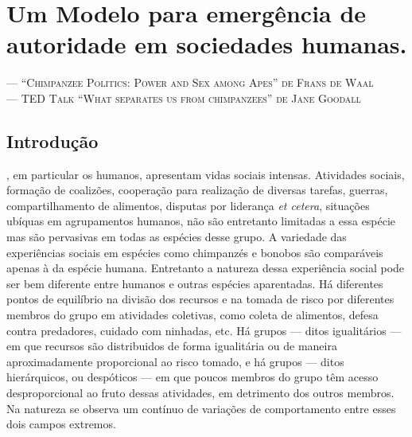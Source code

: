 \chapter{Um Modelo para emergência de autoridade em sociedades humanas.}
\begin{epigraphs}
 {\---- \textsc{``Chimpanzee Politics: Power and Sex among Apes'' de Frans de Waal\citep{deWaal2007}}}
 \\[2ex]
 {\---- \textsc{TED Talk ``What separates us from chimpanzees'' de Jane Goodall\citep{Goodall2002}}}
\end{epigraphs}

\label{ch:autoridade}
\section{Introdução}

, em particular os humanos, apresentam vidas sociais intensas. Atividades sociais, formação de coalizões, cooperação para realização de diversas tarefas, guerras, compartilhamento de alimentos, disputas por liderança \textit{et cetera}, situações ubíquas em agrupamentos humanos, não são entretanto limitadas a essa espécie mas são pervasivas em todas as espécies desse grupo. A variedade das experiências sociais em espécies como chimpanzés e bonobos são comparáveis apenas à da espécie humana\cite[-3.2cm]{deWaal2007, deWaal1990}. Entretanto a natureza dessa experiência social pode ser bem diferente entre humanos e outras espécies aparentadas. Há diferentes pontos de equilíbrio na divisão dos recursos e na tomada de risco por diferentes membros do grupo em atividades coletivas, como coleta de alimentos, defesa contra predadores, cuidado com ninhadas, etc\cite{Vehrencamp1983,Boehm2001}. Há grupos --- ditos igualitários --- em que recursos são distribuidos de forma igualitária ou de maneira aproximadamente proporcional ao risco tomado, e há grupos --- ditos hierárquicos, ou despóticos --- em que poucos membros do grupo têm acesso desproporcional ao fruto dessas atividades, em detrimento dos outros membros. Na natureza se observa um contínuo de variações de comportamento entre esses dois campos extremos. 

